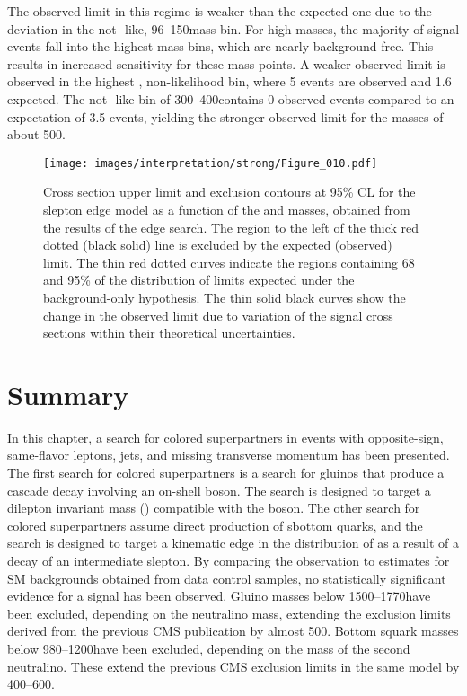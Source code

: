 The observed limit in this regime is weaker than the expected one due to the deviation in the not-\ttbar-like, 96--150\GeV mass bin.
For high \secondchi masses, the majority of signal events fall into the highest mass bins, which are nearly background free. 
This results in increased sensitivity for these mass points. 
A weaker observed limit is observed in the highest \mll, non-\ttbar likelihood bin, where 5 events are observed and 1.6 expected.   
The not-\ttbar-like \mll bin of 300--400\GeV contains 0 observed events compared to an expectation of 3.5 events, yielding the stronger observed limit for the \secondchi masses of about 500\GeV.
\begin{figure}
  \centering
    \texttt{[image: images/interpretation/strong/Figure\_010.pdf]}
    \caption{Cross section upper limit and exclusion contours at 95\% CL for the slepton edge model
      as a function of the \sbottom and \secondchi masses,
      obtained from the results of the edge search.
      The region to the left of the thick red dotted (black solid) line is excluded by the expected (observed) limit.
     The thin red dotted curves indicate the regions containing 68 and 95\% of the distribution of limits
     expected under the background-only hypothesis.
     The thin solid black curves show the change in the observed limit due to
     variation of the signal cross sections within their theoretical uncertainties.
    }
    \label{fig:Limits2}
\end{figure}
\section{Summary}
\noindent
\justify
In this chapter, a search for colored superpartners in events with opposite-sign, same-flavor leptons, jets, and missing transverse momentum has been presented. 
The first search for colored superpartners is a search for gluinos that produce a cascade decay involving an on-shell \PZ boson. 
The search is designed to target a dilepton invariant mass (\mll) compatible with the \PZ boson. 
The other search for colored superpartners assume direct production of sbottom quarks, and the search is designed to target a kinematic edge in the distribution of \mll as a result of a decay of an intermediate slepton.
By comparing the observation to estimates for SM backgrounds obtained from data control samples, no statistically significant evidence for a signal has been observed.
\newpara
\noindent\justify
Gluino masses below 1500--1770\GeV have been excluded, depending on the neutralino mass, extending the exclusion limits derived from the previous CMS publication by almost 500\GeV.
Bottom squark masses below 980--1200\GeV have been excluded, depending on the mass of the second neutralino.
These extend the previous CMS exclusion limits in the same model by 400--600\GeV.
